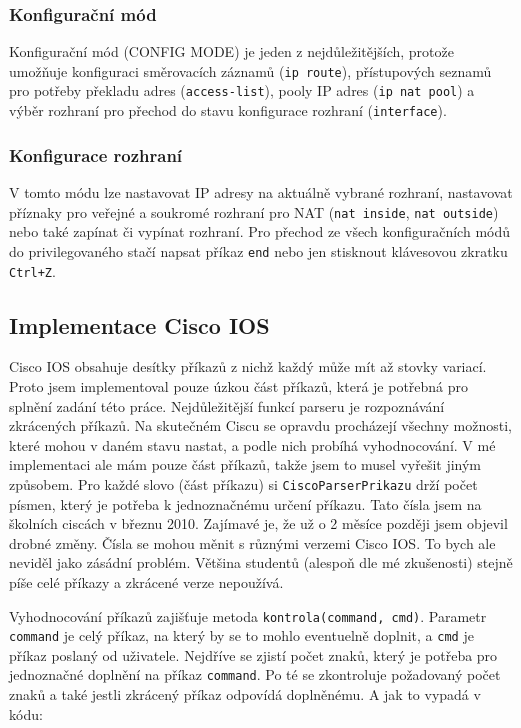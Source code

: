 \subsubsection{Konfigurační mód}
Konfigurační mód (CONFIG MODE) je jeden z nejdůležitějších, protože umožňuje konfiguraci směrovacích záznamů (\verb|ip route|), přístupových seznamů pro potřeby překladu adres (\verb|access-list|), pooly IP adres (\verb|ip nat pool|) a výběr rozhraní pro přechod do stavu konfigurace rozhraní (\verb|interface|).

\subsubsection{Konfigurace rozhraní} \label{configif}
V tomto módu lze nastavovat IP adresy na aktuálně vybrané rozhraní, nastavovat příznaky pro veřejné a soukromé rozhraní pro NAT (\verb|nat inside|, \verb|nat outside|) nebo také zapínat či vypínat rozhraní. Pro přechod ze všech konfiguračních módů do privilegovaného stačí napsat příkaz \verb|end| nebo jen stisknout klávesovou zkratku \verb|Ctrl+Z|.


\subsection{Implementace Cisco IOS}
Cisco IOS obsahuje desítky příkazů z nichž každý může mít až stovky variací. Proto jsem implementoval pouze úzkou část příkazů, která je potřebná pro splnění zadání této práce. Nejdůležitější funkcí parseru je rozpoznávání zkrácených příkazů. Na skutečném Ciscu se opravdu procházejí všechny možnosti, které mohou v daném stavu nastat, a podle nich probíhá vyhodnocování. V mé implementaci ale mám pouze část příkazů, takže jsem to musel vyřešit jiným způsobem. Pro každé slovo (část příkazu) si \verb|CiscoParserPrikazu| drží počet písmen, který je potřeba k jednoznačnému určení příkazu. Tato čísla jsem  na školních ciscách v březnu 2010. Zajímavé je, že už o 2 měsíce později jsem objevil drobné změny. Čísla se mohou měnit s různými verzemi Cisco IOS. To bych ale neviděl jako zásádní problém. Většina studentů (alespoň dle mé zkušenosti) stejně píše celé příkazy a zkrácené verze nepoužívá.

Vyhodnocování příkazů zajišťuje metoda \verb|kontrola(command, cmd)|. Parametr \verb|command| je celý příkaz, na který by se to mohlo eventuelně doplnit, a \verb|cmd| je příkaz poslaný od uživatele. Nejdříve se zjistí počet znaků, který je potřeba pro jednoznačné doplnění na příkaz \verb|command|. Po té se zkontroluje požadovaný počet znaků a také jestli zkrácený příkaz odpovídá doplněnému. A jak to vypadá v kódu:

